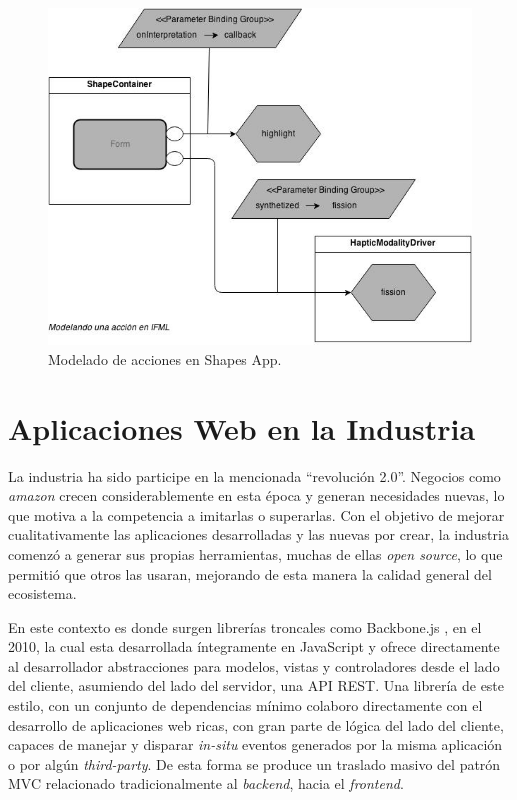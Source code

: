 \begin{center}
  \begin{figure}[h]
    \includegraphics[scale=1,width=\textwidth]{gfx/ifml_example}
    \caption{Modelado de acciones en Shapes App.}
    \label{fig:extension_ifml_example}
  \end{figure}
\end{center}

\section{Aplicaciones Web en la Industria} \label{sec:extension_industria_intro}

La industria ha sido participe en la mencionada ``revolución 2.0''. Negocios como \emph{amazon} crecen considerablemente en esta época y generan necesidades nuevas, lo que motiva a la competencia a imitarlas o superarlas. Con el objetivo de mejorar cualitativamente las aplicaciones desarrolladas y las nuevas por crear, la industria comenzó a generar sus propias herramientas, muchas de ellas \emph{open source}, lo que permitió que otros las usaran, mejorando de esta manera la calidad general del ecosistema.

En este contexto es donde surgen librerías troncales como Backbone.js \citep{ind:backbone}, en el 2010, la cual esta desarrollada íntegramente en JavaScript y ofrece directamente al desarrollador abstracciones para modelos, vistas y controladores desde el lado del cliente, asumiendo del lado del servidor, una API REST. Una librería de este estilo, con un conjunto de dependencias mínimo colaboro directamente con el desarrollo de aplicaciones web ricas, con gran parte de lógica del lado del cliente, capaces de manejar y disparar \emph{in-situ} eventos generados por la misma aplicación o por algún \emph{third-party}. De esta forma se produce un traslado masivo del patrón MVC relacionado tradicionalmente al \emph{backend}, hacia el \emph{frontend}. 

